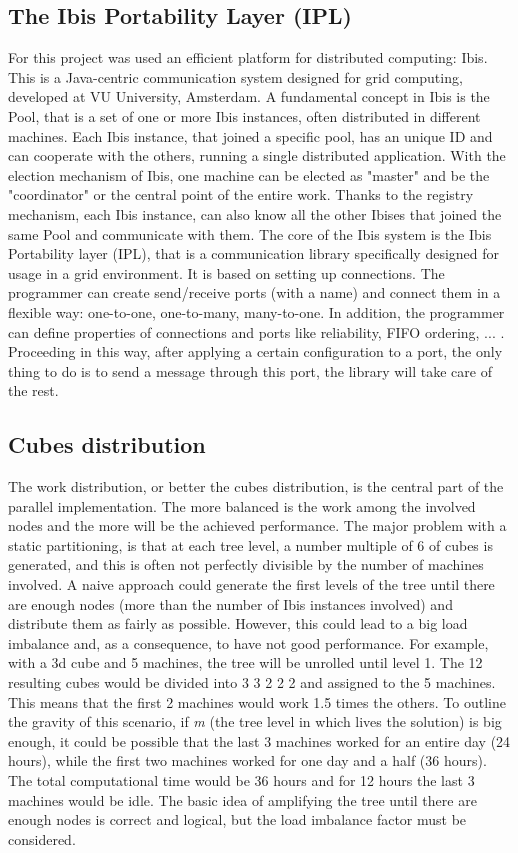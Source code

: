 \documentclass[a4paper]{article}
\begin{document}
\subsection{The Ibis Portability Layer (IPL)}
\label{sec:ibis}
For this project was used an efficient platform for distributed computing: Ibis. This is a Java-centric communication system designed for grid computing, developed at VU University, Amsterdam. A fundamental concept in Ibis is the Pool, that is a set of one or more Ibis instances, often distributed in different machines. Each Ibis instance, that joined a specific pool, has an unique ID and can cooperate with the others, running a single distributed application. With the election mechanism of Ibis, one machine can be elected as "master" and be the "coordinator" or the central point of the entire work. Thanks to the registry mechanism, each Ibis instance, can also know all the other Ibises that joined the same Pool and communicate with them. The core of the Ibis system is the Ibis Portability layer (IPL), that is a communication library specifically designed for usage in a grid environment. It is based on setting up connections. The programmer can create send/receive ports (with a name) and connect them in a flexible way: one-to-one, one-to-many, many-to-one. In addition, the programmer can define properties of connections and ports like reliability, FIFO ordering, ... . Proceeding in this way, after applying a certain configuration to a port, the only thing to do is to send a message through this port, the library will take care of the rest. 

\subsection{Cubes distribution}
\label{sec:cubes_distr}
The work distribution, or better the cubes distribution, is the central part of the parallel implementation. The more balanced is the work among the involved nodes and the more will be the achieved performance. The major problem with a static partitioning, is that at each tree level, a number multiple of 6 of cubes is generated, and this is often not perfectly divisible by the number of machines involved. A naive approach could generate the first levels of the tree until there are enough nodes (more than the number of Ibis instances involved) and distribute them as fairly as possible. However, this could lead to a big load imbalance and, as a consequence, to have not good performance. For example, with a 3d cube and 5 machines, the tree will be unrolled until level 1. The 12 resulting cubes would be divided into 3 3 2 2 2 and assigned to the 5 machines. This means that the first 2 machines would work 1.5 times the others. To outline the gravity of this scenario, if \textit{m} (the tree level in which lives the solution) is big enough, it could be possible that the last 3 machines worked for an entire day (24 hours), while the first two machines worked for one day and a half (36 hours). The total computational time would be 36 hours and for 12 hours the last 3 machines would be idle. 
The basic idea of amplifying the tree until there are enough nodes is correct and logical, but the load imbalance factor must be considered. 
\end{document}
